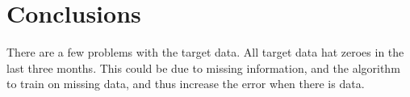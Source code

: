 \documentclass{sig-alternate}
\begin{document}
\section{Conclusions}
There are a few problems with the target data. All target data hat zeroes in the last three months. This could be due to missing information, and the algorithm to train on missing data, and thus increase the error when there is data.



%
%
\end{document}
